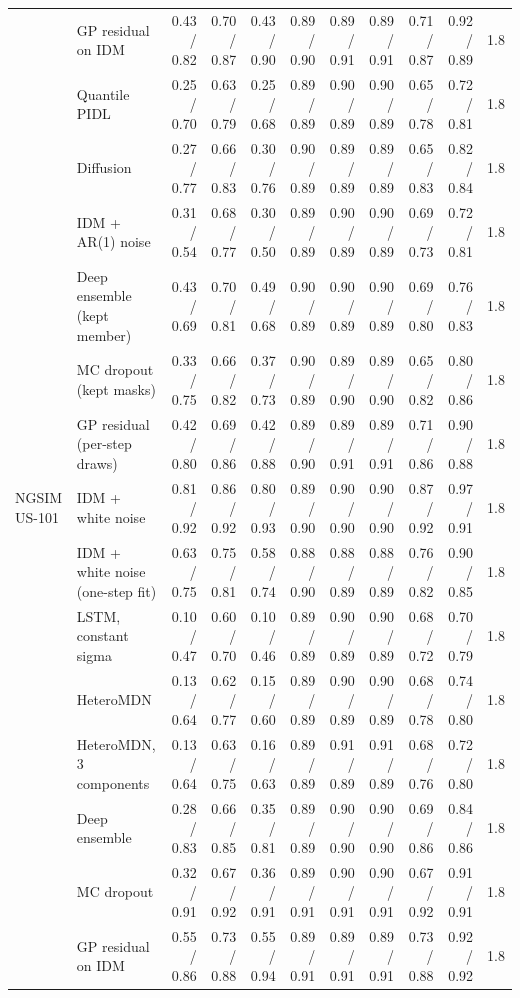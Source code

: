 \begin{longtable}{llrrrrrrrrr}
 & GP residual on IDM & 0.43 / 0.82 & 0.70 / 0.87 & 0.43 / 0.90 & 0.89 / 0.90 & 0.89 / 0.91 & 0.89 / 0.91 & 0.71 / 0.87 & 0.92 / 0.89 & 1.8 \\
 & Quantile PIDL & 0.25 / 0.70 & 0.63 / 0.79 & 0.25 / 0.68 & 0.89 / 0.89 & 0.90 / 0.89 & 0.90 / 0.89 & 0.65 / 0.78 & 0.72 / 0.81 & 1.8 \\
 & Diffusion & 0.27 / 0.77 & 0.66 / 0.83 & 0.30 / 0.76 & 0.90 / 0.89 & 0.89 / 0.89 & 0.89 / 0.89 & 0.65 / 0.83 & 0.82 / 0.84 & 1.8 \\
 & IDM + AR(1) noise & 0.31 / 0.54 & 0.68 / 0.77 & 0.30 / 0.50 & 0.89 / 0.89 & 0.90 / 0.89 & 0.90 / 0.89 & 0.69 / 0.73 & 0.72 / 0.81 & 1.8 \\
 & Deep ensemble (kept member) & 0.43 / 0.69 & 0.70 / 0.81 & 0.49 / 0.68 & 0.90 / 0.89 & 0.90 / 0.89 & 0.90 / 0.89 & 0.69 / 0.80 & 0.76 / 0.83 & 1.8 \\
 & MC dropout (kept masks) & 0.33 / 0.75 & 0.66 / 0.82 & 0.37 / 0.73 & 0.90 / 0.89 & 0.89 / 0.90 & 0.89 / 0.90 & 0.65 / 0.82 & 0.80 / 0.86 & 1.8 \\
 & GP residual (per-step draws) & 0.42 / 0.80 & 0.69 / 0.86 & 0.42 / 0.88 & 0.89 / 0.90 & 0.89 / 0.91 & 0.89 / 0.91 & 0.71 / 0.86 & 0.90 / 0.88 & 1.8 \\
\midrule
NGSIM US-101 & IDM + white noise & 0.81 / 0.92 & 0.86 / 0.92 & 0.80 / 0.93 & 0.89 / 0.90 & 0.90 / 0.90 & 0.90 / 0.90 & 0.87 / 0.92 & 0.97 / 0.91 & 1.8 \\
 & IDM + white noise (one-step fit) & 0.63 / 0.75 & 0.75 / 0.81 & 0.58 / 0.74 & 0.88 / 0.90 & 0.88 / 0.89 & 0.88 / 0.89 & 0.76 / 0.82 & 0.90 / 0.85 & 1.8 \\
 & LSTM, constant sigma & 0.10 / 0.47 & 0.60 / 0.70 & 0.10 / 0.46 & 0.89 / 0.89 & 0.90 / 0.89 & 0.90 / 0.89 & 0.68 / 0.72 & 0.70 / 0.79 & 1.8 \\
 & HeteroMDN & 0.13 / 0.64 & 0.62 / 0.77 & 0.15 / 0.60 & 0.89 / 0.89 & 0.90 / 0.89 & 0.90 / 0.89 & 0.68 / 0.78 & 0.74 / 0.80 & 1.8 \\
 & HeteroMDN, 3 components & 0.13 / 0.64 & 0.63 / 0.75 & 0.16 / 0.63 & 0.89 / 0.89 & 0.91 / 0.89 & 0.91 / 0.89 & 0.68 / 0.76 & 0.72 / 0.80 & 1.8 \\
 & Deep ensemble & 0.28 / 0.83 & 0.66 / 0.85 & 0.35 / 0.81 & 0.89 / 0.89 & 0.90 / 0.90 & 0.90 / 0.90 & 0.69 / 0.86 & 0.84 / 0.86 & 1.8 \\
 & MC dropout & 0.32 / 0.91 & 0.67 / 0.92 & 0.36 / 0.91 & 0.89 / 0.91 & 0.90 / 0.91 & 0.90 / 0.91 & 0.67 / 0.92 & 0.91 / 0.91 & 1.8 \\
 & GP residual on IDM & 0.55 / 0.86 & 0.73 / 0.88 & 0.55 / 0.94 & 0.89 / 0.91 & 0.89 / 0.91 & 0.89 / 0.91 & 0.73 / 0.88 & 0.92 / 0.92 & 1.8 \\

\end{longtable}
